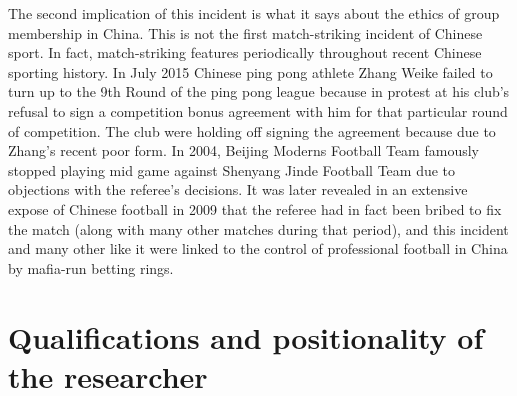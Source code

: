 {The second implication of this incident is what it says about the ethics of group membership in China.  This is not the first match-striking incident of Chinese sport. In fact, match-striking features periodically throughout recent Chinese sporting history.  In July 2015 Chinese ping pong athlete Zhang Weike failed to turn up to the 9th Round of the ping pong league because in protest at his club's refusal to sign a competition bonus agreement with him for that particular round of competition. The club were holding off signing the agreement because due to Zhang's recent poor form.  In 2004, Beijing Moderns Football Team famously stopped playing mid game against Shenyang Jinde Football Team due to objections with the referee's decisions. It was later revealed in an extensive expose of Chinese football in 2009 that the referee had in fact been bribed to fix the match (along with many other matches during that period), and this incident and many other like it were linked to the control of professional football in China by mafia-run betting rings.





\section{Qualifications and positionality of the researcher}

}
